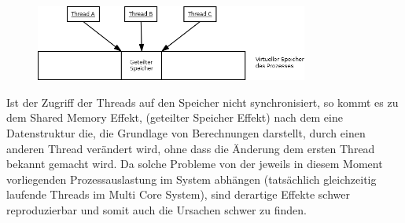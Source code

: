 \documentclass[12pt,oneside,a4paper,bibtotoc,liststotoc]{scrreprt}
\begin{document}
\begin{figure}[H]
  \begin{centering}
    \includegraphics[width=0.8\textwidth]{img/SharedMemory_RaceCondition.png}
    \label{SharedMemory_RaceCondition}
  \end{centering}
\end{figure}
Ist der Zugriff der Threads auf den Speicher nicht synchronisiert, so kommt es zu dem Shared Memory Effekt, (geteilter Speicher Effekt) nach dem eine Datenstruktur die, die Grundlage von Berechnungen darstellt, durch einen anderen Thread verändert wird, ohne dass die Änderung dem ersten Thread bekannt gemacht wird. Da solche Probleme von der jeweils in diesem Moment vorliegenden Prozessauslastung im System abhängen (tatsächlich gleichzeitig laufende Threads im Multi Core System), sind derartige Effekte schwer reproduzierbar und somit auch die Ursachen schwer zu finden.
\end{document}
